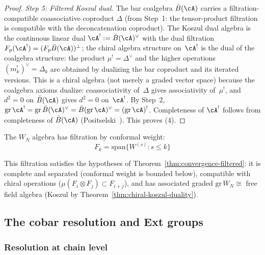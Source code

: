 \begin{proof}
\emph{Step 5: Filtered Koszul dual.}
The bar coalgebra $\bar{B}(\cA)$ carries a filtration-compatible
coassociative coproduct $\Delta$ (from Step~1: the tensor-product
filtration is compatible with the deconcatenation coproduct).  The
Koszul dual algebra is the continuous linear dual
$\cA^! := \bar{B}(\cA)^\vee$ with the dual filtration
$F_p(\cA^!) = (F_p\bar{B}(\cA))^\perp$; the chiral algebra structure
on~$\cA^!$ is the dual of the coalgebra structure: the product
$\mu^! = \Delta^\vee$ and the higher operations
$(m_k^!)^\vee = \Delta_k$ are obtained by dualizing the
bar coproduct and its iterated versions.  This is a chiral algebra
(not merely a graded vector space) because the coalgebra axioms
dualize: coassociativity of~$\Delta$ gives associativity of~$\mu^!$,
and $d^2 = 0$ on $\bar{B}(\cA)$ gives $d^2 = 0$
on~$\cA^!$.  By Step~2,
$\mathrm{gr}\,\cA^! = \mathrm{gr}\,\bar{B}(\cA)^\vee
= \bar{B}(\mathrm{gr}\,\cA)^\vee
= (\mathrm{gr}\,\cA)^!$.
Completeness of $\cA^!$ follows from completeness of
$\bar{B}(\cA)$ (Positselski~\cite[\S A.1]{Positselski11}).
This proves (4).
\end{proof}

\begin{example}
The $W_N$ algebra has filtration by conformal weight:
\[F_k = \mathrm{span}\{W^{(s)} : s \leq k\}\]

This filtration satisfies the hypotheses of Theorem~\ref{thm:convergence-filtered}: it is complete and separated (conformal weight is bounded below), compatible with chiral operations ($\mu(F_i \otimes F_j) \subset F_{i+j}$), and has associated graded $\mathrm{gr}\,W_N \cong$ free field algebra (Koszul by Theorem~\ref{thm:chiral-koszul-duality}).
\end{example}


\subsection{The cobar resolution and Ext groups}

\subsubsection{Resolution at chain level}

